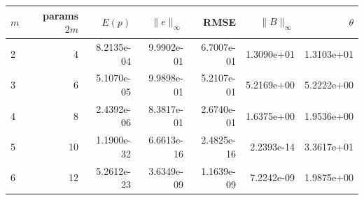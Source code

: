 \begin{tabular}{lrrrrrr}
\toprule
$m$ & params $2m$ & $E(p)$ & $\|e\|_\infty$ & RMSE & $\|B\|_\infty$ & $\theta$ \\
\midrule
2 & 4 & 8.2135e-04 & 9.9902e-01 & 6.7007e-01 & 1.3090e+01 & 1.3103e+01 \\
3 & 6 & 5.1070e-05 & 9.9898e-01 & 5.2107e-01 & 5.2169e+00 & 5.2222e+00 \\
4 & 8 & 2.4392e-06 & 8.3817e-01 & 2.6740e-01 & 1.6375e+00 & 1.9536e+00 \\
5 & 10 & 1.1900e-32 & 6.6613e-16 & 2.4825e-16 & 2.2393e-14 & 3.3617e+01 \\
6 & 12 & 5.2612e-23 & 3.6349e-09 & 1.1639e-09 & 7.2242e-09 & 1.9875e+00 \\
\bottomrule
\end{tabular}
